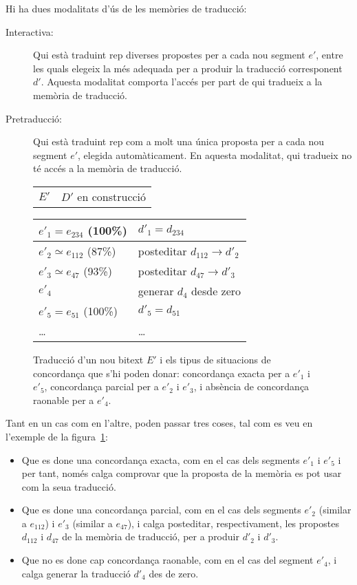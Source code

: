 Hi ha dues modalitats d'ús de les memòries de traducció:
\begin{description}
\item[Interactiva:] Qui està traduint rep diverses propostes per a
  cada nou segment $e'$, entre les quals elegeix la més adequada per a
  produir la traducció corresponent $d'$. Aquesta modalitat comporta
  l'accés per part de qui tradueix a la memòria de traducció.
\item[Pretraducció:] Qui està traduint rep com a molt una única
  proposta per a cada nou segment $e'$, elegida automàticament. En
  aquesta modalitat, qui tradueix no té accés a la memòria de
  traducció.
\end{description}
\begin{figure}
  \begin{center}
    \begin{tabular}{p{3cm}p{4cm}}
           $E'$ & $D'$ en construcció      
    \end{tabular}
    \begin{tabular}{|p{3cm}|p{4cm}|}
\hline
        $e'_1=e_{234}$ (100\%)& $d'_1=d_{234}$ \\\hline
        $e'_2\simeq e_{112}$ (87\%) & posteditar $d_{112} \to d'_2$ \\\hline
        $e'_3\simeq e_{47}$ (93\%) & posteditar $d_{47} \to d'_3$ \\\hline
        $e'_4$ & generar $d_4$ desde zero \\\hline
        $e'_5=e_{51}$ (100\%) & $d'_5=d_{51}$ \\\hline
        \ldots & \ldots \\\hline
    \end{tabular}
  \end{center}
  \caption{Traducció d'un nou bitext $E'$ i els tipus de situacions de concordança que s'hi poden donar: concordança exacta per a $e'_1$ i $e'_5$, concordança parcial per a $e'_2$ i $e'_3$, i absència de concordança raonable per a $e'_4$.}
  \label{fg:pretrad}
\end{figure}
Tant en un cas com en l'altre, poden passar tres coses, tal com es veu
en l'exemple de la figura~\ref{fg:pretrad}:
\begin{itemize}
\item Que es done una concordança exacta, com en el cas dels segments
  $e'_1$ i $e'_5$ i per tant, només calga comprovar que la proposta de
  la memòria es pot usar com la seua traducció.
\item Que es done una concordança parcial, com en el cas dels segments
  $e'_2$ (similar a $e_{112}$) i $e'_3$ (similar a $e_{47}$), i calga
  posteditar, respectivament, les propostes $d_{112}$ i $d_{47}$ de la
  memòria de traducció, per a produir $d'_2$ i $d'_3$.
\item Que no es done cap concordança raonable, com en el cas del
  segment $e'_4$, i calga generar la traducció $d'_4$ des de zero.
\end{itemize}


